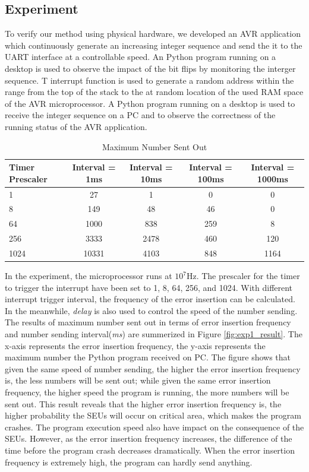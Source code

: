 \subsection{Experiment}
To verify our method using physical hardware, we developed an AVR application which continuously generate an increasing integer sequence and send the it to the UART interface at a controllable speed. An Python program running on a desktop is used to observe the impact of the bit flips by monitoring the interger sequence. T interrupt function is used to generate a random address within the range from the top of the stack to the  at random location of the used RAM space of the AVR microprocessor. A Python program running on a desktop is used to receive the integer sequence on a PC and to observe the correctness of the running status of the AVR application.

\begin{table}
	\center
    \begin{tabular}{|l|c|c|c|c|}
    \hline
   \textbf{Timer Prescaler}   & \textbf{Interval = 1ms} & \textbf{Interval = 10ms} & \textbf{Interval = 100ms} & \textbf{Interval = 1000ms}	\\ \hline
    1      	& 27			& 1				& 0				& 0				\\ \hline
    8       & 149			& 48			& 46           	& 0				\\ \hline
    64      & 1000			& 838			& 259		   	& 8				\\ \hline
    256		& 3333			& 2478			& 460      		& 120			\\ \hline
    1024    & 10331			& 4103			& 848           & 1164			\\ \hline
    \end{tabular}
	\vspace{5pt}
    \caption {Maximum Number Sent Out}
    \label{tbl_exp1_result}
\end{table}
In the experiment, the microprocessor runs at $10^7$Hz. The prescaler for the timer to trigger the interrupt have been set to 1, 8, 64, 256, and 1024. With different interrupt trigger interval, the frequency of the error insertion can be calculated. In the meanwhile, \textit{delay} is also used to control the speed of the number sending. The results of maximum number sent out in terms of error insertion frequency and number sending interval(\textit{ms}) are summerized in Figure \ref{fig:exp1_result}. The x-axis represents the error insertion frequency, the y-axis represents the maximum number the Python program received on PC. The figure shows that given the same speed of number sending, the higher the error insertion frequency is, the less numbers will be sent out; while given the same error insertion frequency, the higher speed the program is running, the more numbers will be sent out. This result reveals that the higher error insertion frequency is, the higher probability the SEUs will occur on critical area, which makes the program crashes. The program execution speed also have impact on the consequence of the SEUs. However, as the error insertion frequency increases, the difference of the time before the program crash decreases dramatically. When the error insertion frequency is extremely high, the program can hardly send anything.

